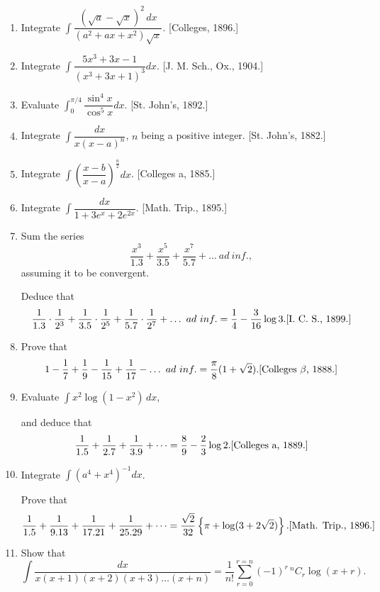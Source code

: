 \documentclass[11pt, a4paper]{article}
\newcommand{\source}[1]{\hfill\textnormal{[#1]}}
\begin{document}
\begin{enumerate}[leftmargin=2em]
\item Integrate $\displaystyle\int \dfrac{(\sqrt a-\sqrt x)^2\,dx}{(a^2+ax+x^2)\sqrt{x}}$. \source{Colleges, 1896.}

\item Integrate $\displaystyle\int \dfrac{5x^3+3x-1}{(x^3+3x+1)^3}dx$. \source{J. M. Sch., Ox., 1904.}

\item Evaluate $\displaystyle\int_0^{\pi/4} \dfrac{\sin^4x}{\cos^5x}dx$. \source{St. John's, 1892.}

\item Integrate $\displaystyle\int \dfrac{dx}{x(x-a)^n}$, $n$ being a positive integer. \source{St. John's, 1882.}

\item Integrate $\displaystyle\int \left(\dfrac{x-b}{x-a}\right)^{\frac{n}{2}}dx$. \source{Colleges a, 1885.}

\item Integrate $\displaystyle\int \dfrac{dx}{1+3e^x+2e^{2x}}$. \source{Math. Trip., 1895.}

\item Sum the series
\[
\dfrac{x^3}{1.3}+\dfrac{x^5}{3.5}+\dfrac{x^7}{5.7}+\dots\ ad\ inf.,
\]
assuming it to be convergent.

Deduce that
\[
\dfrac{1}{1.3}\cdot\dfrac{1}{2^3}+\dfrac{1}{3.5}\cdot\dfrac{1}{2^5}+\dfrac{1}{5.7}\cdot\dfrac{1}{2^7}+\dots\ ad\ inf. = \dfrac14-\dfrac{3}{16}\log 3. \source{I. C. S., 1899.}
\]

\item Prove that
\[
1-\dfrac17+\dfrac19-\dfrac{1}{15}+\dfrac{1}{17}-\dots\ ad\ inf. = \dfrac{\pi}{8}(1+\sqrt2). \source{Colleges $\beta$, 1888.}
\]

\item Evaluate $\displaystyle\int x^2\log(1-x^2)\,dx$,

and deduce that
\[
\dfrac{1}{1.5}+\dfrac{1}{2.7}+\dfrac{1}{3.9}+\dots = \dfrac89-\dfrac23\log 2. \source{Colleges a, 1889.}
\]

\item Integrate $\displaystyle\int (a^4+x^4)^{-1}dx$.

Prove that
\[
\dfrac{1}{1.5}+\dfrac{1}{9.13}+\dfrac{1}{17.21}+\dfrac{1}{25.29}+\dots = \dfrac{\sqrt2}{32}\left\{\pi+\log(3+2\sqrt2)\right\}. \source{Math. Trip., 1896.}
\]

\item Show that
\[
\int \dfrac{dx}{x(x+1)(x+2)(x+3)\dots(x+n)} = \dfrac{1}{n!}\sum_{r=0}^{r=n}(-1)^r\, {}^nC_r\log(x+r).
\]


\end{enumerate}
\end{document}
